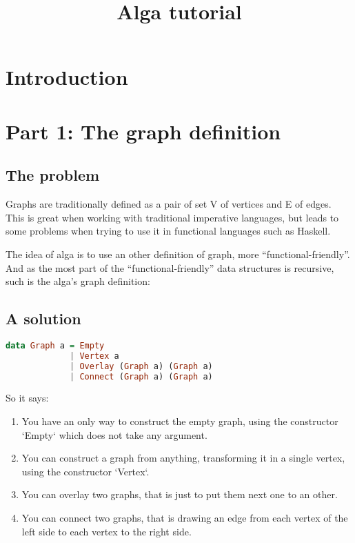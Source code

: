 \documentclass[10pt,a4paper]{article}
\title{Alga tutorial}
\date{}
\begin{document}
\maketitle

\section{Introduction}


\section{Part 1: The graph definition}
\subsection{The problem}
Graphs are traditionally defined as a pair of set V of vertices and E of edges. This is great when working with traditional imperative languages, but leads to some problems when trying to use it in functional languages such as Haskell.

The idea of alga is to use an other definition of graph, more “functional-friendly”. And as the most part of the “functional-friendly” data structures is recursive, such is the alga’s graph definition:

\subsection{A solution}
\begin{lstlisting}[language=Haskell, frame=single]
data Graph a = Empty
             | Vertex a
             | Overlay (Graph a) (Graph a)
             | Connect (Graph a) (Graph a)
\end{lstlisting}

So it says:

\begin{enumerate}
\item You have an only way to construct the empty graph, using the constructor `Empty` which does not take any argument.

\item You can construct a graph from anything, transforming it in a single vertex, using the constructor `Vertex`.

\item You can overlay two graphs, that is just to put them next one to an other.


\item You can connect two graphs, that is drawing an edge from each vertex of the left side to each vertex to the right side.

\end{enumerate}
\end{document}
